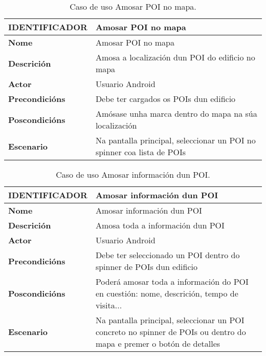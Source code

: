 \begin{table}[tbh]
	\begin{tabular}{|l|p{10cm}|}
		\hline 
		\textbf{IDENTIFICADOR}	& \textbf{Amosar POI no mapa} \\ 
		\hline 
		\textbf{Nome} & Amosar POI no mapa \\ 
		\hline 
		\textbf{Descrición} & Amosa a localización dun POI do edificio no mapa \\ 
		\hline 
		\textbf{Actor} & Usuario Android \\ 
		\hline 
		\textbf{Precondicións} & Debe ter cargados os POIs dun edificio \\ 
		\hline 
		\textbf{Poscondicións} & Amósase unha marca dentro do mapa na súa localización \\ 
		\hline 
		\textbf{Escenario} & Na pantalla principal, seleccionar un POI no spinner coa lista de POIs \\ 
		\hline 
	\end{tabular}
	\caption{Caso de uso Amosar POI no mapa.}
	\label{tab:cuAmosarPOIMapa}
\end{table}

\begin{table}[tbh]
	\begin{tabular}{|l|p{10cm}|}
		\hline 
		\textbf{IDENTIFICADOR}	& \textbf{Amosar información dun POI} \\ 
		\hline 
		\textbf{Nome} & Amosar información dun POI \\ 
		\hline 
		\textbf{Descrición} & Amosa toda a información dun POI \\ 
		\hline 
		\textbf{Actor} & Usuario Android \\ 
		\hline 
		\textbf{Precondicións} & Debe ter seleccionado un POI dentro do spinner de POIs dun edificio \\ 
		\hline 
		\textbf{Poscondicións} & Poderá amosar toda a información do POI en cuestión: nome, descrición, tempo de visita... \\ 
		\hline 
		\textbf{Escenario} & Na pantalla principal, seleccionar un POI concreto no spinner de POIs ou dentro do mapa e premer o botón de detalles \\ 
		\hline 
	\end{tabular}
	\caption{Caso de uso Amosar información dun POI.}
	\label{tab:cuAmosarPOI}
\end{table}

